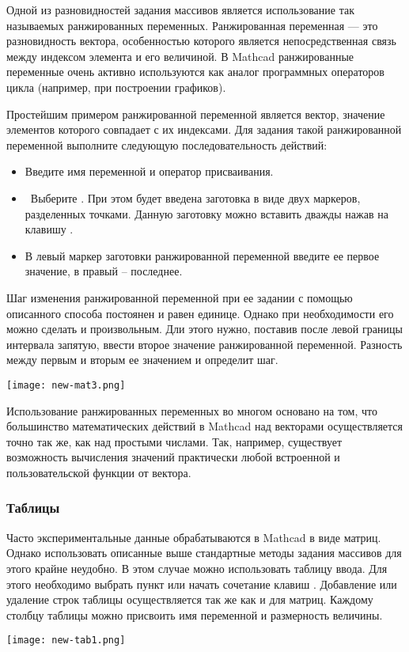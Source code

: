 
Одной из разновидностей задания массивов является использование так называемых ранжированных переменных. Ранжированная переменная --- это разновидность вектора, особенностью которого является непосредственная связь между индексом элемента и его величиной. В Mathcad ранжированные переменные очень активно используются как аналог программных операторов цикла (например, при построении графиков).

Простейшим примером ранжированной переменной является вектор, значение элементов которого совпадает с их индексами. Для задания такой ранжированной переменной выполните следующую последовательность действий:
\begin{itemize}
	\item Введите имя переменной и оператор присваивания.
	\item  Выберите  . При этом будет введена заготовка в виде двух маркеров, разделенных точками.	Данную заготовку можно вставить дважды нажав на клавишу .
	\item В левый  маркер заготовки ранжированной переменной введите ее первое значение, в правый – последнее.
\end{itemize}

Шаг изменения ранжированной переменной при ее задании с помощью описанного способа постоянен и равен единице. Однако при необходимости его можно сделать и произвольным. Дли этого нужно, поставив после левой границы интервала запятую, ввести второе значение ранжированной переменной. Разность между первым и вторым ее значением и определит шаг. 
\begin{center}
	\texttt{[image: new-mat3.png]}
\end{center}

Использование ранжированных переменных во многом основано на том, что большинство математических действий в Mathcad над векторами осуществляется точно так же, как над простыми числами. Так, например, существует возможность вычисления значений практически любой встроенной и пользовательской функции от вектора. 

\subsubsection*{Таблицы}
Часто экспериментальные данные обрабатываются в Mathcad в виде матриц. Однако использовать описанные выше стандартные методы задания массивов для этого крайне неудобно. В этом случае можно использовать таблицу ввода. Для этого необходимо выбрать пункт  или начать сочетание клавиш . Добавление или удаление строк таблицы осуществляется так же как и для матриц. Каждому столбцу таблицы можно присвоить имя переменной и размерность величины.
\begin{center}
	\texttt{[image: new-tab1.png]}
\end{center}


